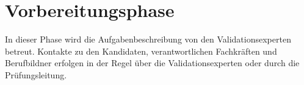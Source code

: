 \chapter{Vorbereitungsphase}
In dieser Phase wird die Aufgabenbeschreibung von den Validationsexperten betreut. Kontakte zu den Kandidaten, verantwortlichen Fachkräften und Berufbildner erfolgen in der Regel über die Validationsexperten oder durch die Prüfungsleitung.
